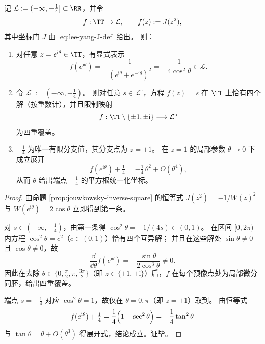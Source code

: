 \begin{theorem}\label{thm:leyang-branch-cover-square-root}
记 \(\mathcal L:=(-\infty,-\tfrac14]\subset\RR\)，并令
\[
f:\TT\to\mathcal L,\qquad f(z):=J(z^2),
\]
其中坐标门 \(J\) 由 \eqref{eq:lee-yang-J-def} 给出。
则：
\begin{enumerate}
  \item 对任意 \(z=e^{\mathrm{i}\theta}\in\TT\)，有显式表示
  \[
  f(e^{\mathrm{i}\theta})
  =-\frac{1}{(e^{\mathrm{i}\theta}+e^{-\mathrm{i}\theta})^2}
  =-\frac{1}{4\cos^2\theta}\in\mathcal L.
  \]
  \item 令 \(\mathcal L^\circ:=(-\infty,-\tfrac14)\)。
  则对任意 \(s\in\mathcal L^\circ\)，方程 \(f(z)=s\) 在 \(\TT\) 上恰有四个解（按重数计），并且限制映射
  \[
  f:\TT\setminus\{\pm 1,\pm\mathrm{i}\}\longrightarrow \mathcal L^\circ
  \]
  为四重覆盖。
  \item \(-\tfrac14\) 为唯一有限分支值，其分支点为 \(z=\pm 1\)。
  在 \(z=1\) 的局部参数 \(\theta\to 0\) 下成立展开
  \[
  f(e^{\mathrm{i}\theta})+\tfrac14=-\tfrac14\,\theta^2+O(\theta^4),
  \]
  从而 \(\theta\) 给出端点 \(-\tfrac14\) 的平方根统一化坐标。
\end{enumerate}
\end{theorem}
\begin{proof}
由命题 \ref{prop:jouwkowsky-inverse-square} 的恒等式 \(J(z^2)=-1/W(z)^2\) 与 \(W(e^{\mathrm{i}\theta})=2\cos\theta\) 立即得到第一条。
\par
对 \(s\in(-\infty,-\tfrac14)\)，由第一条得 \(\cos^2\theta=-1/(4s)\in(0,1)\)。
在区间 \([0,2\pi)\) 内方程 \(\cos^2\theta=c^2\)（\(c\in(0,1)\)）恰有四个互异解；
并且在这些解处 \(\sin\theta\neq 0\) 且 \(\cos\theta\neq 0\)，故
\[
\frac{\dd}{\dd\theta}f(e^{\mathrm{i}\theta})=-\frac{\sin\theta}{2\cos^3\theta}\neq 0.
\]
因此在去除 \(\theta\in\{0,\tfrac\pi2,\pi,\tfrac{3\pi}{2}\}\)（即 \(z\in\{\pm1,\pm\mathrm{i}\}\)）后，\(f\) 在每个预像点处为局部微分同胚，给出四重覆盖。
\par
端点 \(s=-\tfrac14\) 对应 \(\cos^2\theta=1\)，故仅在 \(\theta=0,\pi\)（即 \(z=\pm1\)）取到。
由恒等式
\[
f(e^{\mathrm{i}\theta})+\tfrac14
=\frac14\Bigl(1-\sec^2\theta\Bigr)
=-\frac14\tan^2\theta
\]
与 \(\tan\theta=\theta+O(\theta^3)\) 得展开式，结论成立。证毕。
\end{proof}

\endinput
